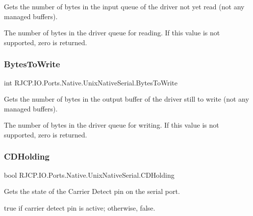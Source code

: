 Gets the number of bytes in the input queue of the driver not yet read (not any managed buffers). 

The number of bytes in the driver queue for reading. If this value is not supported, zero is returned. \mbox{\label{class_r_j_c_p_1_1_i_o_1_1_ports_1_1_native_1_1_unix_native_serial_a808ab45c7f5b01cf20ed91d731eef703}} 
\subsubsection{\texorpdfstring{BytesToWrite}{BytesToWrite}}
{\footnotesize\ttfamily int R\+J\+C\+P.\+I\+O.\+Ports.\+Native.\+Unix\+Native\+Serial.\+Bytes\+To\+Write\hspace{0.3cm}{\ttfamily [get]}}



Gets the number of bytes in the output buffer of the driver still to write (not any managed buffers). 

The number of bytes in the driver queue for writing. If this value is not supported, zero is returned. \mbox{\label{class_r_j_c_p_1_1_i_o_1_1_ports_1_1_native_1_1_unix_native_serial_ae91656ef24b84073a58d2410a8c58ed2}} 
\subsubsection{\texorpdfstring{CDHolding}{CDHolding}}
{\footnotesize\ttfamily bool R\+J\+C\+P.\+I\+O.\+Ports.\+Native.\+Unix\+Native\+Serial.\+C\+D\+Holding\hspace{0.3cm}{\ttfamily [get]}}



Gets the state of the Carrier Detect pin on the serial port. 

{\ttfamily true} if carrier detect pin is active; otherwise, {\ttfamily false}. \mbox{\label{class_r_j_c_p_1_1_i_o_1_1_ports_1_1_native_1_1_unix_native_serial_a7d0278566dd04c28b8d3f9e64a6edc6e}} 
